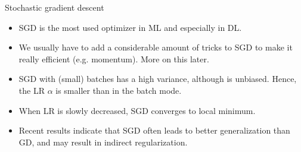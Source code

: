 \begin{vbframe}{Stochastic gradient descent}
  \begin{itemize}
    \item SGD is the most used optimizer in ML and especially in DL.
    \item We usually have to add a considerable amount of tricks to SGD to make it really 
        efficient (e.g. momentum). More on this later.
    \item SGD with (small) batches has a high variance, although is unbiased. 
      Hence, the LR $\alpha$ is smaller than in the batch mode.
    \item When LR is slowly decreased, SGD converges to  local minimum.
    \item Recent results indicate that SGD often leads to better generalization than GD, and may result in indirect regularization.
   \end{itemize}
\vspace*{0.5cm}



\end{vbframe}

